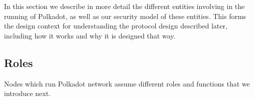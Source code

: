 \documentclass{article}
\begin{document}
In this section we describe in more detail the different entities involving in the running of Polkadot, as well as our security model of these entities. This forms the design context for understanding the protocol design described later, including how it works and why it is designed that way.




\subsection{Roles}\label{sec:roles}
Nodes which run Polkadot network assume different roles and functions that we introduce next.

\end{document}
